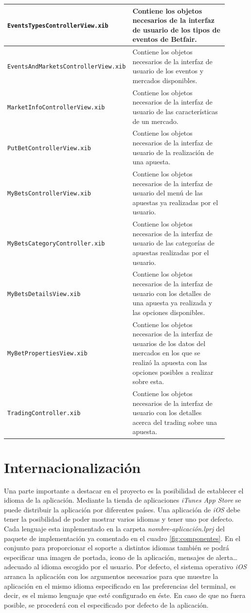 \begin{center}
\begin{supertabular}{||p{0.45\linewidth}|p{0.45\linewidth}||}
\hline
\lstinline!EventsTypesControllerView.xib! & Contiene los objetos necesarios de la interfaz de usuario de los tipos de eventos de Betfair. \\
\hline
\lstinline!EventsAndMarketsControllerView.xib! & Contiene los objetos necesarios de la interfaz de usuario de los eventos y mercados disponibles. \\
\hline
\lstinline!MarketInfoControllerView.xib! & Contiene los objetos necesarios de la interfaz de usuario de las características de un mercado. \\
\hline
\lstinline!PutBetControllerView.xib! & Contiene los objetos necesarios de la interfaz de usuario de la realización de una apuesta. \\
\hline
\lstinline!MyBetsControllerView.xib! & Contiene los objetos necesarios de la interfaz de usuario del menú de las apuestas ya realizadas por el usuario. \\
\hline
\lstinline!MyBetsCategoryController.xib! & Contiene los objetos necesarios de la interfaz de usuario de las categorías de apuestas realizadas por el usuario. \\
\hline
\lstinline!MyBetsDetailsView.xib! & Contiene los objetos necesarios de la interfaz de usuario con los detalles de una apuesta ya realizada y las opciones disponibles. \\
\hline
\lstinline!MyBetPropertiesView.xib! & Contiene los objetos necesarios de la interfaz de usuarios de los datos del mercados en los que se realizó la apuesta con las opciones posibles a realizar sobre esta. \\
\hline
\lstinline!TradingController.xib! & Contiene los objetos necesarios de la interfaz de usuario con los detalles acerca del trading sobre una apuesta. \\
\hline 
\hline 
\end{supertabular} 
\label{fig:componentes}
\end{center} 

\section{Internacionalización}
 Una parte importante a destacar en el proyecto es la posibilidad de establecer el idioma de la aplicación. Mediante la tienda de aplicaciones \emph{iTunes App Store} se puede distribuir la aplicación por diferentes países. Una aplicación de \emph{iOS} debe tener la posibilidad de poder mostrar varios idiomas y tener uno por defecto. Cada lenguaje esta implementado en la carpeta \emph{nombre-aplicación.lprj} del paquete de implementación ya comentado en el cuadro \ref{fig:componentes}. En el conjunto para proporcionar el soporte a distintos idiomas también se podrá especificar una imagen de portada, icono de la aplicación, mensajes de alerta\ldots  adecuado al idioma escogido por el usuario. Por defecto, el sistema operativo \emph{iOS} arranca la aplicación con los argumentos necesarios para que muestre la aplicación en el mismo idioma especificado en las preferencias del terminal, es decir, es el mismo lenguaje que esté configurado en éste. En caso de que no fuera posible, se procederá con el especificado por defecto de la aplicación.


